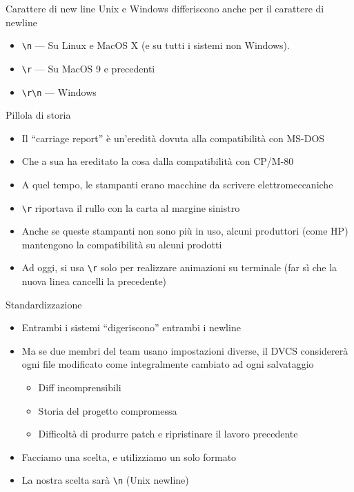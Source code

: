 \documentclass[presentation]{beamer}
\begin{document}
\begin{frame}[allowframebreaks]{Carattere di new line}
	Unix e Windows differiscono anche per il carattere di newline
	\begin{itemize}
		\item \texttt{\textbackslash{}n} --- Su Linux e MacOS X (e su tutti i sistemi non Windows).
		\item \texttt{\textbackslash{}r} --- Su MacOS 9 e precedenti
		\item \texttt{\textbackslash{}r\textbackslash{}n} --- Windows
	\end{itemize}
	\begin{block}{Pillola di storia}
		\begin{itemize}
			\item Il ``carriage report'' è un'eredità dovuta alla compatibilità con MS-DOS
			\item Che a sua ha ereditato la cosa dalla compatibilità con CP/M-80
			\item A quel tempo, le stampanti erano macchine da scrivere elettromeccaniche
			\item \texttt{\textbackslash{}r} riportava il rullo con la carta al margine sinistro
			\item Anche se queste stampanti non sono più in uso, alcuni produttori (come HP) mantengono la compatibilità su alcuni prodotti
			\item Ad oggi, si usa \texttt{\textbackslash{}r} solo per realizzare animazioni su terminale (far sì che la nuova linea cancelli la precedente)
		\end{itemize}
	\end{block}
	\begin{block}{Standardizzazione}
		\begin{itemize}
			\item Entrambi i sistemi ``digeriscono'' entrambi i newline
			\item Ma se due membri del team usano impostazioni diverse, il DVCS considererà ogni file modificato come integralmente cambiato ad ogni salvataggio 
			\begin{itemize}
				\item Diff incomprensibili
				\item Storia del progetto compromessa
				\item Difficoltà di produrre patch e ripristinare il lavoro precedente
			\end{itemize}
			\item Facciamo una scelta, e utilizziamo un solo formato
			\item La nostra scelta sarà \texttt{\textbackslash{}n} (Unix newline)
		\end{itemize}
	\end{block}
\end{frame}
\end{document}

